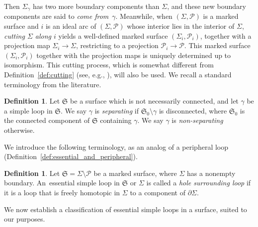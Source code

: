 \documentclass[pdftex]{sigma}
\numberwithin{equation}{section}
\theoremstyle{definition}
\newtheorem{Definition}[Theorem]{Definition}
\begin{document}
Then $\Sigma_\gamma$ has two more boundary components than $\Sigma$, and these new boundary components are said to {\em come from}~$\gamma$.
Meanwhile, when $(\Sigma,\mathcal{P})$ is a marked surface and $i$ is an ideal arc of $(\Sigma,\mathcal{P})$ whose interior lies in the interior of $\Sigma$, {\em cutting $\Sigma$ along $i$} yields a well-defined marked surface $(\Sigma_i,\mathcal{P}_i)$, together with a projection map $\Sigma_i \to \Sigma$, restricting to a projection $\mathcal{P}_i \to \mathcal{P}$. This marked surface $(\Sigma_i,\mathcal{P}_i)$ together with the projection maps is uniquely determined up to isomorphism. This cutting process, which is somewhat different from Definition~\ref{def:cutting} (see, e.g., \cite[Definition and Lemma~3.12]{KLS}), will also be used.
We recall a standard terminology from the literature.
\begin{Definition}
Let $\mathfrak{S}$ be a surface which is not necessarily connected, and let $\gamma$ be a simple loop in $\mathfrak{S}$. We say $\gamma$ is {\em separating} if $\mathfrak{S}_0 \setminus\gamma$ is disconnected, where $\mathfrak{S}_0$ is the connected component of $\mathfrak{S}$ containing $\gamma$. We say $\gamma$ is {\em non-separating} otherwise.
\end{Definition}
We introduce the following terminology, as an analog of a peripheral loop (Definition~\ref{def:essential_and_peripheral}).
\begin{Definition}
\label{def:hole-surrounding}
Let $\mathfrak{S} = \Sigma\setminus\mathcal{P}$ be a marked surface, where $\Sigma$ has a nonempty boundary. An~essential simple loop in $\mathfrak{S}$ or $\Sigma$ is called a {\em hole surrounding loop} if it is a loop that is freely homotopic in $\Sigma$ to a component of $\partial \Sigma$.
\end{Definition}
We now establish a classification of essential simple loops in a surface, suited to our purposes.
\end{document}
